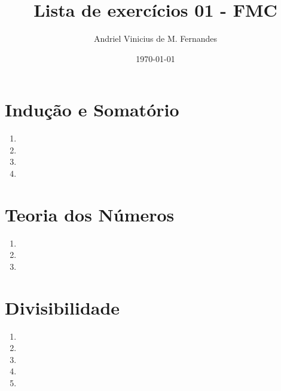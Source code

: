 \documentclass[12pt]{article}
\title{Lista de exercícios 01 - FMC}
\author{Andriel Vinicius de M. Fernandes}
\date{\today}
\begin{document}
\maketitle
\section{Indução e Somatório}
\begin{enumerate}
	\item 
	\item 
	\item 
	\item 
\end{enumerate}
\section{Teoria dos Números}
\begin{enumerate}
	\item 
	\item 
	\item 
\end{enumerate}
\section{Divisibilidade}
\begin{enumerate}
	\item 
	\item 
	\item 
	\item 
	\item 
\end{enumerate}
\end{document}
